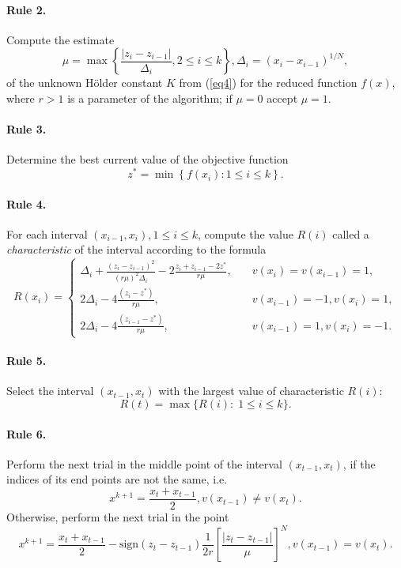 \documentclass[runningheads]{llncs}
\begin{document}
\paragraph{Rule 2.} Compute the estimate
\begin{equation}\label{eq7} 
\mu = \max\left\{ \frac{|z_i-z_{i-1}|}{\Delta _i}, 2 \leq i \leq k \right\} , \Delta _i= (x_i-x_{i-1})^{1/N},
\end{equation}
of the unknown H{\"o}lder constant $K$ from (\ref{eq4}) for the reduced function $f(x)$, where $r>1$ is a parameter of the algorithm; if $\mu=0$ accept $\mu=1$.
\paragraph{Rule 3.} Determine the best current value of the objective function
\begin{equation}\label{eq8} 
z^*=\min \left\{ f(x_i): 1\leq i \leq k \right\}.
\end{equation}

\paragraph{Rule 4.} For each interval $(x_{i-1},x_i),1 \leq i \leq k$, compute the value $R(i)$ called a \textit{characteristic} of the interval according to the formula
\begin{equation}\label{eq9} 
R(x_i)=
  \begin{cases}
    \Delta _i+\frac {{(z_i-z_{i-1})}^2}{{(r \mu)}^2 \Delta _i} - 2 \frac {z_i+z_{i-1}-2z^*}{r \mu}, & {\quad  v(x_i)=v(x_{i-1})=1},\\
    2 \Delta _i-4 \frac {(z_i-z^*)}{r \mu}, & {\quad  v(x_{i-1})=-1, v(x_i)=1},\\
    2 \Delta _i-4 \frac {(z_{i-1}-z^*)}{r \mu}, & {\quad  v(x_{i-1})=1, v(x_i)=-1.}
  \end{cases}
\end{equation}

\paragraph{Rule 5.} Select the interval $(x_{t-1},x_t)$ with the largest value of characteristic $R(i)$:
\[
R(t)= \max\{R(i): \; 1 \leq i \leq k\}.
\]

\paragraph{Rule 6.} Perform the next trial in the middle point of the interval $(x_{t-1},x_t)$, if the indices of its end points are not the same, i.e.
\begin{equation}\label{eq10} 
x^{k+1}=\frac {x_t+x_{t-1}}{2}, v(x_{t-1})\neq v(x_t).
\end{equation}
Otherwise, perform the next trial in the point
\begin{equation}\label{eq11} 
x^{k+1}= \frac {x_t+x_{t-1}}{2} -  \text{sign} {(z_t-z_{t-1})} \frac{1}{2r} \left[\frac {{|z_t-z_{t-1}|}}{\mu} \right]^N, v(x_{t-1})=v(x_t).
\end{equation}
\end{document}
